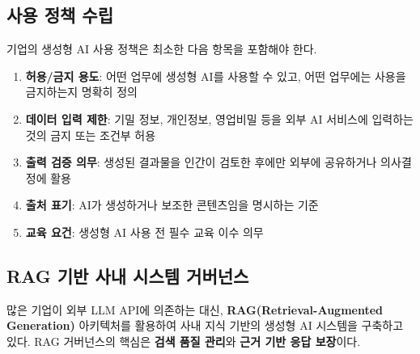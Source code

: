 \subsection{사용 정책 수립}
\label{sec:gen.2.2}

기업의 생성형 AI 사용 정책은 최소한 다음 항목을 포함해야 한다.

\begin{enumerate}
 \item \textbf{허용/금지 용도}: 어떤 업무에 생성형 AI를 사용할 수 있고, 어떤 업무에는 사용을 금지하는지 명확히 정의
 \item \textbf{데이터 입력 제한}: 기밀 정보, 개인정보, 영업비밀 등을 외부 AI 서비스에 입력하는 것의 금지 또는 조건부 허용
 \item \textbf{출력 검증 의무}: 생성된 결과물을 인간이 검토한 후에만 외부에 공유하거나 의사결정에 활용
 \item \textbf{출처 표기}: AI가 생성하거나 보조한 콘텐츠임을 명시하는 기준
 \item \textbf{교육 요건}: 생성형 AI 사용 전 필수 교육 이수 의무
\end{enumerate}

\subsection{RAG 기반 사내 시스템 거버넌스}
\label{sec:gen.2.3}

많은 기업이 외부 LLM API에 의존하는 대신, \textbf{RAG(Retrieval-Augmented Generation)} 아키텍처를 활용하여 사내 지식 기반의 생성형 AI 시스템을 구축하고 있다. RAG 거버넌스의 핵심은 \textbf{검색 품질 관리}와 \textbf{근거 기반 응답 보장}이다.


